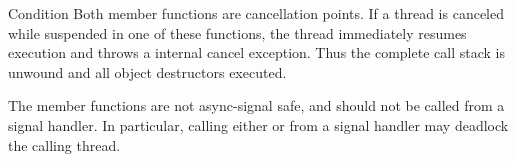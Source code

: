 \begin{classpage}{Condition}
Both  member functions are cancellation
points. If a thread is canceled while suspended in one of these
functions, the thread immediately resumes execution and throws a
\lisle internal cancel exception. Thus the complete call stack is
unwound and all object destructors executed.

The  member functions are not async-signal safe, and
should not be called from a signal handler. In particular, calling
either  or 
from a signal handler may deadlock the calling thread.

\end{classpage}
